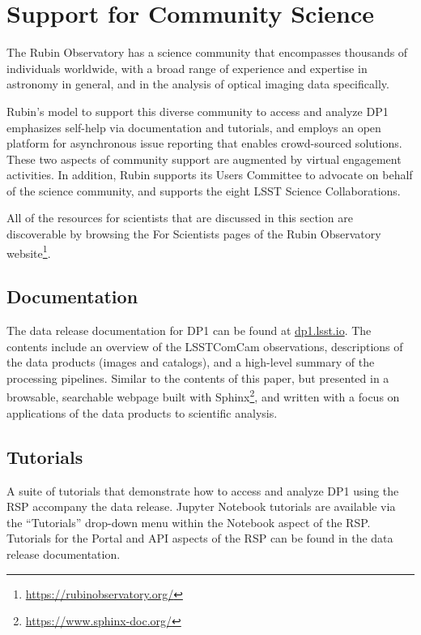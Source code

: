 \section{Support for Community Science
\label{sec:community_science}}

The Rubin Observatory has a science community that encompasses thousands of individuals worldwide, with a broad range of experience and expertise in astronomy in general, and in the analysis of optical imaging data specifically.

Rubin's model to support this diverse community to access and analyze \gls{DP1} emphasizes self-help via documentation and tutorials, and employs an open platform for asynchronous issue reporting that enables crowd-sourced solutions.
These two aspects of community support are augmented by virtual engagement activities.
In addition, Rubin supports its Users Committee to advocate on behalf of the science community, and supports the eight \gls{LSST} Science Collaborations.

All of the resources for scientists that are discussed in this section are discoverable by browsing the For Scientists pages of the Rubin Observatory website\footnote{\url{https://rubinobservatory.org/}}.

\subsection{Documentation
\label{ssec:documentation}}

The data release documentation for \gls{DP1} can be found at \url{dp1.lsst.io}.
The contents include an overview of the \gls{LSSTComCam} observations, descriptions of the data products (images and catalogs), and a high-level summary of the processing pipelines.
Similar to the contents of this paper, but presented in a browsable, searchable webpage built with Sphinx\footnote{\url{https://www.sphinx-doc.org/}}, and written with a focus on applications of the data products to scientific analysis.

\subsection{Tutorials
\label{ssec:tutorials}}

A suite of tutorials that demonstrate how to access and analyze \gls{DP1} using the RSP accompany the data release.
Jupyter Notebook tutorials are available via the ``Tutorials'' drop-down menu within the Notebook aspect of the \gls{RSP}.
Tutorials for the Portal and API aspects of the \gls{RSP} can be found in the data release documentation.

